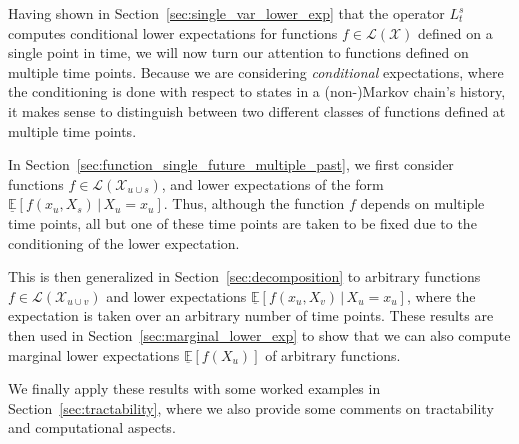 \documentclass[10pt,a4paper]{paper}
\theoremstyle{definition}
\newcommand{\states}{\mathcal{X}}
\newcommand{\gambles}{\mathcal{L}}
\newcommand{\gamblesX}{\gambles(\states)}
\begin{document}
Having shown in Section~\ref{sec:single_var_lower_exp} that the operator $L_t^s$ computes conditional lower expectations for functions $f\in\gamblesX$ defined on a single point in time, we will now turn our attention to functions defined on multiple time points. Because we are considering \emph{conditional} expectations, where the conditioning is done with respect to states in a (non-)Markov chain's history, it makes sense to distinguish between two different classes of functions defined at multiple time points. 

In Section~\ref{sec:function_single_future_multiple_past}, we first consider functions $f\in\gambles(\states_{u\cup s})$, and lower expectations of the form $\underline{\mathbb{E}}[f(x_u,X_s)\,\vert\,X_u=x_u]$. Thus, although the function $f$ depends on multiple time points, all but one of these time points are taken to be fixed due to the conditioning of the lower expectation.

This is then generalized in Section~\ref{sec:decomposition} to arbitrary functions $f\in\gambles(\states_{u\cup v})$ and lower expectations $\underline{\mathbb{E}}[f(x_u,X_v)\,\vert\,X_u=x_u]$, where the expectation is taken over an arbitrary number of time points. These results are then used in Section~\ref{sec:marginal_lower_exp} to show that we can also compute marginal lower expectations $\underline{\mathbb{E}}[f(X_u)]$ of arbitrary functions.

We finally apply these results with some worked examples in Section~\ref{sec:tractability}, where we also provide some comments on tractability and computational aspects.
\end{document}
